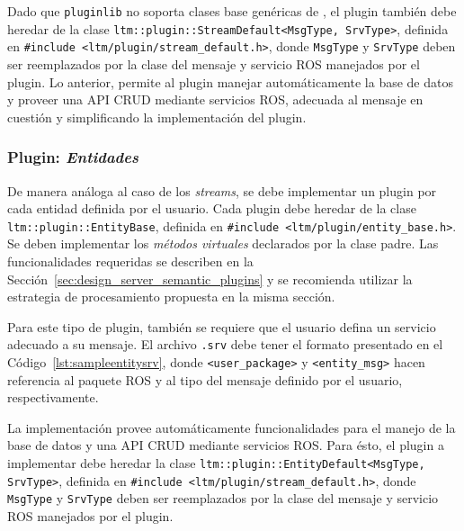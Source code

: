 Dado que \texttt{pluginlib} no soporta clases base genéricas de \CC, el plugin también debe heredar de la clase \texttt{ltm::plugin::StreamDefault\textless MsgType, SrvType\textgreater}, definida en \texttt{\#include \textless ltm/plugin/stream\_default.h\textgreater}, donde \texttt{MsgType} y \texttt{SrvType} deben ser reemplazados por la clase del mensaje y servicio ROS manejados por el plugin. Lo anterior, permite al plugin manejar automáticamente la base de datos y proveer una API CRUD mediante servicios ROS, adecuada al mensaje en cuestión y simplificando la implementación del plugin.


\subsubsection{Plugin: \textit{Entidades}}

De manera análoga al caso de los \textit{streams}, se debe implementar un plugin por cada entidad definida por el usuario. Cada plugin debe heredar de la clase \texttt{ltm::plugin::EntityBase}, definida en \texttt{\#include \textless ltm/plugin/entity\_base.h\textgreater}. Se deben implementar los \textit{métodos virtuales} declarados por la clase padre. Las funcionalidades requeridas se describen en la Sección~\ref{sec:design_server_semantic_plugins} y se recomienda utilizar la estrategia de procesamiento propuesta en la misma sección.

Para este tipo de plugin, también se requiere que el usuario defina un servicio adecuado a su mensaje. El archivo \texttt{.srv} debe tener el formato presentado en el Código~\ref{lst:sampleentitysrv}, donde \texttt{\textless user\_package\textgreater} y \texttt{\textless entity\_msg\textgreater} hacen referencia al paquete ROS y al tipo del mensaje definido por el usuario, respectivamente.
\lstset{style=/Style/ROS/MSG}


La implementación provee automáticamente funcionalidades para el manejo de la base de datos y una API CRUD mediante servicios ROS. Para ésto, el plugin a implementar debe heredar la clase \texttt{ltm::plugin::EntityDefault\textless MsgType, SrvType\textgreater}, definida en \texttt{\#include \textless ltm/plugin/stream\_default.h\textgreater}, donde \texttt{MsgType} y \texttt{SrvType} deben ser reemplazados por la clase del mensaje y servicio ROS manejados por el plugin.



